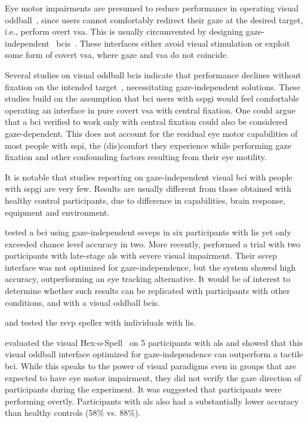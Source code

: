 \documentclass[twocolumn]{article}
\begin{document}
Eye motor impairments are presumed to reduce performance in operating visual
oddball~\cite{VanDenKerchove2024a}, since users
cannot comfortably redirect their gaze at the desired target,
i.e., perform overt \ac{vsa}.
This is usually circumvented by designing gaze-independent~
\acp{bci}~\cite{Riccio2012}.
These interfaces either avoid visual stimulation or exploit some form of
covert \ac{vsa}, where gaze and \ac{vsa} do not coincide.

Several studies on visual oddball \acp{bci} indicate that performance declines without fixation on the intended target~\cite{Brunner2010, Treder2010, RonAngevin2019}, necessitating gaze-independent solutions.
These studies build on the assumption that \ac{bci} users with \ac{sspgi}
would feel comfortable operating an interface in pure covert \ac{vsa} with
central fixation.
One could argue that a \ac{bci} verified to work only with central fixation could
also be considered gaze-dependent.
This does not account for the residual eye motor capabilities of most people
with \ac{sspi}, the (dis)comfort they experience while
performing gaze fixation and other confounding factors resulting from their eye
motility.

It is notable that studies reporting on
gaze-independent visual \ac{bci} with people with \ac{sspgi} are very few.
Results are usually different from those obtained with healthy control
participants, due to difference in capabilities, brain
response, equipment and environment.

\textcite{Lesenfants2014} tested a \ac{bci} using gaze-independent \acp{ssvep} in six
participants with \ac{lis} yet only exceeded chance level accuracy in two.
More recently, \textcite{Peters2020} performed a trial with two
participants with late-stage \ac{als} with severe visual impairment.
Their \ac{ssvep} interface was not optimized for gaze-independence, but the
system showed high accuracy, outperforming an eye tracking alternative.
It would be of interest to determine whether such results can be replicated with
participants with other conditions, and with a visual oddball \acp{bci}.

\textcite{Orhan2012} and \textcite{Oken2014} tested the \ac{rsvp} speller with
individuals with \ac{lis}.

\textcite{Severens2014} evaluated the visual Hex-o-Spell~\cite{Treder2010} on 5
participants with \ac{als} and showed that this visual oddball interface optimized
for gaze-independence can outperform a tactile \ac{bci}.
While this speaks to the power of visual paradigms even in groups that are
expected to have eye motor impairment, they did not verify the gaze direction
of participants during the experiment.
It was suggested that participants were performing overtly.
Participants with \ac{als} also had a substantially lower accuracy than healthy
controls (58\% vs. 88\%).
\end{document}
